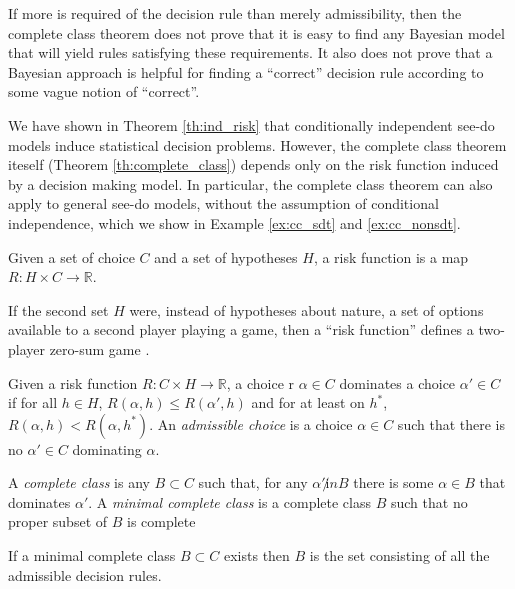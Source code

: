 If more is required of the decision rule than merely admissibility, then the complete class theorem does not prove that it is easy to find any Bayesian model that will yield rules satisfying these requirements. It also does not prove that a Bayesian approach is helpful for finding a ``correct'' decision rule according to some vague notion of ``correct''.

We have shown in Theorem \ref{th:ind_risk} that conditionally independent see-do models induce statistical decision problems. However, the complete class theorem iteself (Theorem \ref{th:complete_class}) depends only on the risk function induced by a decision making model. In particular, the complete class theorem can also apply to general see-do models, without the assumption of conditional independence, which we show in Example \ref{ex:cc_sdt} and \ref{ex:cc_nonsdt}.

\begin{definition}
Given a set of choice $C$ and a set of hypotheses $H$, a risk function is a map $R:H\times C\to \mathbb{R}$.
\end{definition}

If the second set $H$ were, instead of hypotheses about nature, a set of options available to a second player playing a game, then a ``risk function'' defines a two-player zero-sum game \citet{toutenburg_ferguson_1967}.

\begin{definition}\label{def:admissible_decision}
Given a risk function $R:C\times H\to \mathbb{R}$, a choice r $\alpha\in C$ dominates a choice $\alpha'\in C$ if for all $h\in H$, $R(\alpha,h)\leq R(\alpha',h)$ and for at least on $h^*$, $R(\alpha,h)<R(\alpha,h^*)$. An \emph{admissible choice} is a choice $\alpha\in C$ such that there is no $\alpha'\in C$ dominating $\alpha$.
\end{definition}

\begin{definition}\label{th:complete_class}
A \emph{complete class} is any $B\subset C$ such that, for any $\alpha'\not in B$ there is some $\alpha\in B$ that dominates $\alpha'$. A \emph{minimal complete class} is a complete class $B$ such that no proper subset of $B$ is complete
\end{definition}

\begin{theorem}
If a minimal complete class $B\subset C$ exists then $B$ is the set consisting of all the admissible decision rules.
\end{theorem}

